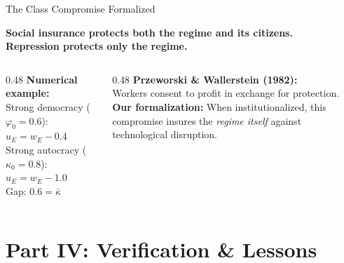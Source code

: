 \documentclass[
  ignorenonframetext,
  aspectratio=169]{beamer}
\begin{document}
\begin{frame}{The Class Compromise Formalized}
\protect{}\label{the-class-compromise-formalized}
\begin{center}
\textbf{Social insurance protects both the regime and its citizens.}\\
\textbf{Repression protects only the regime.}
\end{center}

\vspace{0.2cm}

\begin{columns}[T]
\begin{column}{0.48\textwidth}
\small
\textbf{Numerical example:}\\[2pt]
Strong democracy ($\varphi_0 = 0.6$): $u_E = w_E - 0.4$\\[3pt]
Strong autocracy ($\kappa_0 = 0.8$): $u_E = w_E - 1.0$\\[3pt]
Gap: $0.6 = \bar{\kappa}$ \checkmark
\end{column}
\begin{column}{0.48\textwidth}
\small
\textbf{Przeworski \& Wallerstein (1982):}\\[2pt]
Workers consent to profit in exchange for protection.\\[3pt]
\textbf{Our formalization:} When institutionalized, this compromise insures the \emph{regime itself} against technological disruption.
\end{column}
\end{columns}
\end{frame}

\section{Part IV: Verification \&
Lessons}\label{part-iv-verification-lessons}
\end{document}
